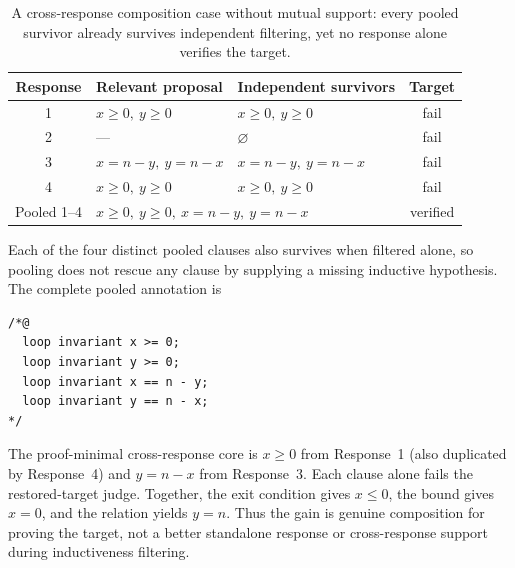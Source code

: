 \begin{table}[H]
\centering
\small
\setlength{\tabcolsep}{4pt}
\begin{tabular}{cllc}
\toprule
\rowcolor{algobg}
Response & Relevant proposal & Independent survivors & Target \\
\midrule
1 & \(x\geq0,\ y\geq0\) & \(x\geq0,\ y\geq0\) & fail \\
2 & --- & \(\varnothing\) & fail \\
3 & \(x=n-y,\ y=n-x\) & \(x=n-y,\ y=n-x\) & fail \\
4 & \(x\geq0,\ y\geq0\) & \(x\geq0,\ y\geq0\) & fail \\
\midrule
Pooled 1--4 & \multicolumn{2}{l}{\(x\geq0,\ y\geq0,\ x=n-y,\ y=n-x\)} & verified \\
\bottomrule
\end{tabular}
\caption{A cross-response composition case without mutual support: every
pooled survivor already survives independent filtering, yet no response alone
verifies the target.}
\label{tab:no-support-composition-case}
\end{table}

\noindent\begin{minipage}{\textwidth}
Each of the four distinct pooled clauses also survives when filtered alone,
so pooling does not rescue any clause by supplying a missing inductive
hypothesis.  The complete pooled annotation is
\begin{lstlisting}
/*@
  loop invariant x >= 0;
  loop invariant y >= 0;
  loop invariant x == n - y;
  loop invariant y == n - x;
*/
\end{lstlisting}
The proof-minimal cross-response core is \(x\geq0\) from Response~1 (also
duplicated by Response~4) and \(y=n-x\) from Response~3.  Each clause alone
fails the restored-target judge.  Together, the exit condition gives
\(x\leq0\), the bound gives \(x=0\), and the relation yields \(y=n\).
Thus the gain is genuine composition for proving the target, not a better
standalone response or cross-response support during inductiveness filtering.
\end{minipage}

